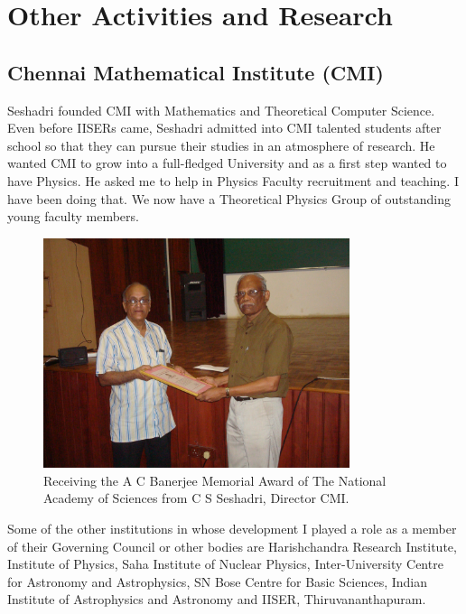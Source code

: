\chapter{Other Activities and Research}

\section*{Chennai Mathematical Institute (CMI)}

Seshadri founded CMI with Mathematics and Theoretical Computer Science. 
Even before IISERs came, Seshadri admitted into CMI talented students 
after school so that they can pursue their studies in an atmosphere of 
research. He wanted CMI to grow into a full-fledged University and as a 
first step wanted to have Physics. He asked me to help in Physics 
Faculty recruitment and teaching. I have been doing that. We now have a 
Theoretical Physics Group of outstanding young faculty members.

\begin{figure}[h]
\centering
\includegraphics[width=0.8\textwidth]{images/Rajaji-seshadri.jpg}
\caption{\small{Receiving the A C Banerjee Memorial Award of The National\- Academy of Sciences from C S Seshadri, Director CMI.}}
\end{figure}

Some of the other institutions in whose development I pla\-yed a role as a 
member of their Governing Council or other bo\-dies are Harishchandra 
Research Institute, Institute of Physics, Saha Institute of Nuclear 
Physics, Inter-University Centre for Astro\-nomy and Astrophysics, SN Bose 
Centre for Basic Sciences, Indian Institute of Astrophysics and 
Astronomy and IISER, Thiruvananthapuram.
\vspace{-\topsep}
